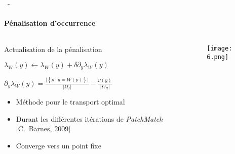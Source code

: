 \documentclass[aspectratio=169, 22pt]{beamer}
\begin{document}
\begin{frame}{\secname~- \subsecname}
  \framesubtitle{Pénalisation d'occurrence}
  \begin{columns}
    \begin{column}{0.5\linewidth}      
      \begin{block}{Actualisation de la pénalisation}
        \small
        \begin{center}
          $\lambda_W(y) \leftarrow \lambda_W(y) + \delta \partial_y \lambda_W(y) $
          
          $\partial_y\lambda_W(y) = \frac{\lvert\left\{p\ |\ y =
              W(p)\right\}\rvert}{\lvert\Omega_I\rvert} -
          \frac{\nu(y)}{\lvert\Omega_R\rvert}$
        \end{center}
        
        \begin{itemize}
        \item Méthode pour le transport optimal
        \item Durant les différentes itérations de \emph{PatchMatch} [C.~Barnes, 2009]
        \item Converge vers un point fixe
        \end{itemize}
      \end{block}    
    \end{column}
    
    \begin{column}{0.5\linewidth}
      \begin{figure}
        \centering
        \texttt{[image: 6.png]}
      \end{figure}
    \end{column}
  \end{columns}
\end{frame}
\end{document}
